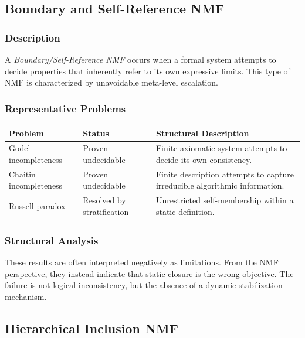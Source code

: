 \documentclass[11pt]{article}
\begin{document}
\subsection{Boundary and Self-Reference NMF}

\subsubsection{Description}

A \emph{Boundary/Self-Reference NMF} occurs when a formal system attempts
to decide properties that inherently refer to its own expressive limits.
This type of NMF is characterized by unavoidable meta-level escalation.

\subsubsection{Representative Problems}

\begin{center}
\begin{tabular}{|l|l|p{7cm}|}
\hline
Problem & Status & Structural Description \\
\hline
Godel incompleteness & Proven undecidable &
Finite axiomatic system attempts to decide its own
consistency. \\
\hline
Chaitin incompleteness & Proven undecidable &
Finite description attempts to capture irreducible
algorithmic information. \\
\hline
Russell paradox & Resolved by stratification &
Unrestricted self-membership within a static definition. \\
\hline
\end{tabular}
\end{center}

\subsubsection{Structural Analysis}

These results are often interpreted negatively as limitations.
From the NMF perspective, they instead indicate that static closure
is the wrong objective.
The failure is not logical inconsistency, but the absence of a
dynamic stabilization mechanism.

\subsection{Hierarchical Inclusion NMF}
\end{document}
